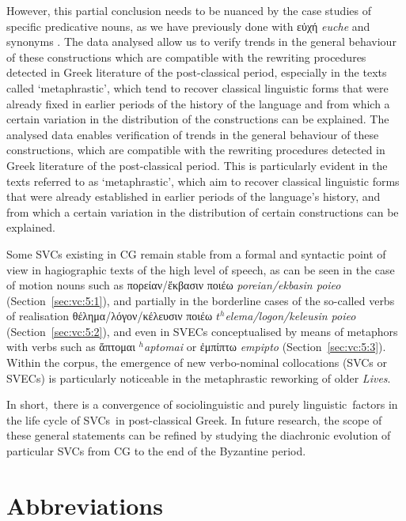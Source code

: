 \documentclass[output=paper,colorlinks,citecolor=brown]{langscibook}
\begin{document}
However, this partial conclusion needs to be nuanced by the case studies of specific
predicative nouns, as we have previously done with εὐχή \textit{euche} and synonyms
\parencite{VivesCuestaAlfonsoandMadrigalAceroLucía-2022404}. The data analysed allow us to
verify trends in the general behaviour of these constructions which are compatible with
the rewriting procedures detected in Greek literature of the post-classical period,
especially in the texts called `metaphrastic', which tend to recover classical linguistic
forms that were already fixed in earlier periods of the history of the language and from
which a certain variation in the distribution of the constructions can be explained. The
analysed data enables verification of trends in the general behaviour of these
constructions, which are compatible with the rewriting procedures detected in Greek
literature of the post-classical period. This is particularly evident in the texts
referred to as `metaphrastic', which aim to recover classical linguistic forms that were
already established in earlier periods of the language's history, and from which a certain
variation in the distribution of certain constructions can be explained.

Some SVCs existing in CG remain stable from a formal and syntactic point of view
in hagiographic texts of the high level of speech, as can be seen in the case of motion
nouns such as πορείαν/ἔκβασιν ποιέω \emph{poreian/ekbasin poieo}
(Section~\ref{sec:vc:5:1}), and partially in the borderline cases of the so-called verbs
of realisation θέλημα/λόγον/κέλευσιν ποιέω \emph{$t^h$elema/logon/keleusin poieo}
(Section~\ref{sec:vc:5:2}), and even in SVECs conceptualised by means of metaphors with
verbs such as ἅπτομαι \emph{$^h$aptomai} or ἐμπίπτω \emph{empipto}
(Section~\ref{sec:vc:5:3}). Within the corpus, the emergence of new verbo-nominal
collocations (SVCs or SVECs) is particularly noticeable in the metaphrastic reworking of
older \emph{Lives}.

In short,~there is a convergence of sociolinguistic and purely linguistic~factors in the
life cycle of SVCs~in post-classical Greek. In future research, the scope of these general
statements can be refined by studying the diachronic evolution of particular SVCs from CG
to the end of the Byzantine period.

\section*{Abbreviations}\label{abbreviations}
\end{document}
